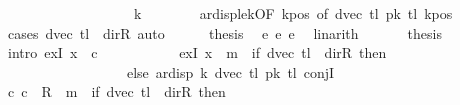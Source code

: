\begin{isabellebody}
\ \ \ \ \ \ \ \ \ \ \ \ \ \ \ \ {\isasymle}\ {}\ {\isacharasterisk}{\kern0pt}\ {\isacharquery}{\kern0pt}k{\isachardoublequoteclose}\isanewline
\ \ \ \ \ \ \isamarkupfalse%
\ ar{\isacharunderscore}{\kern0pt}disp{\isacharunderscore}{\kern0pt}le{\isacharunderscore}{\kern0pt}{}k{\isacharbrackleft}{\kern0pt}OF\ kpos{\isacharcomma}{\kern0pt}\ of\ {\isachardoublequoteopen}dvec\ {\isacharquery}{\kern0pt}tl{\isachardoublequoteclose}\ {\isachardoublequoteopen}{\isacharquery}{\kern0pt}pk\ {\isacharquery}{\kern0pt}tl{\isachardoublequoteclose}{\isacharbrackright}{\kern0pt}\ kpos\isanewline
\ \ \ \ \ \ \isamarkupfalse%
\ {\isacharparenleft}{\kern0pt}cases\ {\isachardoublequoteopen}dvec\ {\isacharquery}{\kern0pt}tl\ {\isacharequal}{\kern0pt}\ dir{\isachardot}{\kern0pt}R{\isachardoublequoteclose}{\isacharparenright}{\kern0pt}\ auto\isanewline
\ \ \ \ \isamarkupfalse%
\ {\isacharquery}{\kern0pt}thesis\ \isamarkupfalse%
\ e{}\ e{}\ e{}\ \isamarkupfalse%
\ linarith\isanewline
\ \ \isamarkupfalse%
\isanewline
\ \ \isamarkupfalse%
\ {\isacharquery}{\kern0pt}thesis\isanewline
\ \ \isamarkupfalse%
\ {\isacharparenleft}{\kern0pt}intro\ exI{\isacharbrackleft}{\kern0pt}\ x\ {\isacharequal}{\kern0pt}\ c{}{\isacharbrackright}{\kern0pt}\isanewline
\ \ \ \ \ \ \ \ \ \ \ exI{\isacharbrackleft}{\kern0pt}\ x\ {\isacharequal}{\kern0pt}\ {\isachardoublequoteopen}m{}\ {\isacharplus}{\kern0pt}\ {\isacharparenleft}{\kern0pt}if\ dvec\ {\isacharquery}{\kern0pt}tl\ {\isacharequal}{\kern0pt}\ dir{\isachardot}{\kern0pt}R\ then\ {}\isanewline
\ \ \ \ \ \ \ \ \ \ \ \ \ \ \ \ \ \ else\ ar{\isacharunderscore}{\kern0pt}disp\ {\isacharquery}{\kern0pt}k\ {\isacharparenleft}{\kern0pt}dvec\ {\isacharquery}{\kern0pt}tl{\isacharparenright}{\kern0pt}\ {\isacharparenleft}{\kern0pt}{\isacharquery}{\kern0pt}pk\ {\isacharquery}{\kern0pt}tl{\isacharparenright}{\kern0pt}{\isacharparenright}{\kern0pt}{\isachardoublequoteclose}{\isacharbrackright}{\kern0pt}\ conjI{\isacharparenright}{\kern0pt}\isanewline
\ \ \ \ \isamarkupfalse%
\ {\isachardoublequoteopen}{\isacharparenleft}{\kern0pt}c{}{\isacharcomma}{\kern0pt}\ c{}{\isacharparenright}{\kern0pt}\ {\isasymin}\ R{\isacharprime}{\kern0pt}\ {\isacharcircum}{\kern0pt}{\isacharcircum}{\kern0pt}\ {\isacharparenleft}{\kern0pt}m{}\ {\isacharplus}{\kern0pt}\ {\isacharparenleft}{\kern0pt}if\ dvec\ {\isacharquery}{\kern0pt}tl\ {\isacharequal}{\kern0pt}\ dir{\isachardot}{\kern0pt}R\ then\ {}\isanewline

\end{isabellebody}
